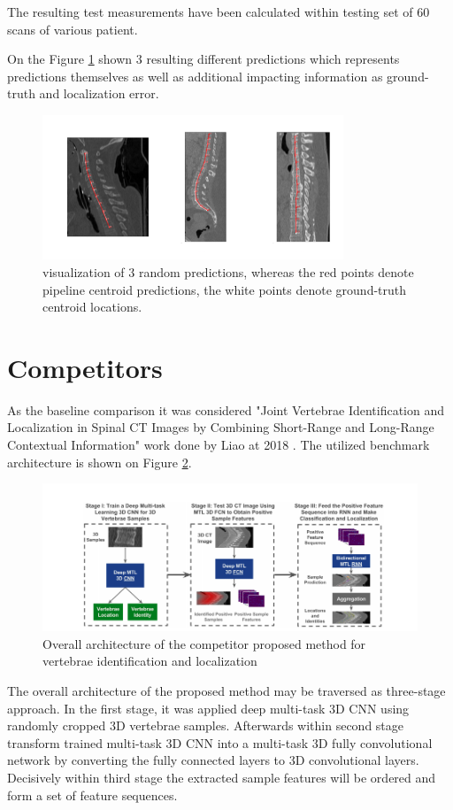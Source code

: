 The resulting test measurements have been calculated within testing set of 60 scans of various patient.

On the Figure \ref{fig:predictions} shown 3 resulting different predictions which represents predictions themselves as well as additional impacting information as ground-truth and localization error. 
\begin{figure}[h]
    \centering \includegraphics[width=9cm]{images/predictions.png}
    \caption {visualization of 3 random predictions, whereas the red points denote pipeline centroid predictions, the white points denote ground-truth centroid locations.}
    \label{fig:predictions}
\end{figure}

\newpage
\section{Competitors}
As the baseline comparison it was considered "Joint Vertebrae Identification and Localization in Spinal CT Images by Combining Short-Range and Long-Range Contextual Information" work done by Liao at 2018 \cite{Liao2018}. The utilized benchmark architecture is shown on Figure \ref{fig:competitor}.

\begin{figure}[h]
    \centering \includegraphics[width=12cm]{images/competitor.png}
    \caption {Overall architecture of the competitor proposed method for vertebrae identification and localization}
    \label{fig:competitor}
\end{figure}

The overall architecture of the proposed method may be traversed as three-stage approach. In the first stage, it was applied deep multi-task 3D CNN using randomly cropped 3D vertebrae samples. Afterwards within second stage transform trained multi-task 3D CNN into a multi-task 3D fully convolutional network by converting the fully connected layers to 3D convolutional layers. Decisively within third stage the extracted sample features will be ordered and form a set of feature sequences. 

